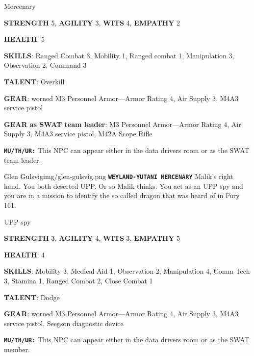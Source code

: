 \begin{rpg-commentbox}{}
    Mercenary

    \textbf{STRENGTH} 5, \textbf{AGILITY} 3, \textbf{WITS} 4, \textbf{EMPATHY} 2

    \textbf{HEALTH}: 5

    \textbf{SKILLS}: Ranged Combat 3, Mobility 1, Ranged combat 1, Manipulation 3, Observation 2, Command 3
    
    \textbf{TALENT}: Overkill
    
    \textbf{GEAR}: worned M3 Personnel Armor---Armor Rating 4, Air Supply 3, M4A3 service pistol

    \textbf{GEAR as SWAT team leader}: M3 Personnel Armor---Armor Rating 4, Air Supply 3, M4A3 service pistol, M42A Scope Rifle

\end{rpg-commentbox}

\begin{rpg-commentbox}{}
    \texttt{\textbf{MU/TH/UR:}} This NPC can appear either in the data drivers room or as the SWAT team leader. 
\end{rpg-commentbox}  

\newsect

\begin{rpg-pcbox}{Glen Gulsvig}{img/glen-gulsvig.png}
    \texttt{\textbf{WEYLAND-YUTANI MERCENARY}} Malik's right hand. You both deserted UPP. Or so Malik thinks. You act as an UPP spy and you are in a mission to identify the so called dragon that was heard of in Fury 161.
\end{rpg-pcbox}

\begin{rpg-commentbox}{}
    UPP spy

    \textbf{STRENGTH} 3, \textbf{AGILITY} 4, \textbf{WITS} 3, \textbf{EMPATHY} 5

    \textbf{HEALTH}: 4

    \textbf{SKILLS}: Mobility 3, Medical Aid 1, Observation 2, Manipulation 4, Comm Tech 3, Stamina 1, Ranged Combat 2, Close Combat 1
    
    \textbf{TALENT}: Dodge
    
    \textbf{GEAR}: worned M3 Personnel Armor---Armor Rating 4, Air Supply 3, M4A3 service pistol, Seegson diagnostic device

\end{rpg-commentbox}

\begin{rpg-commentbox}{}
    \texttt{\textbf{MU/TH/UR:}} This NPC can appear either in the data drivers room or as the SWAT member. 
\end{rpg-commentbox}

